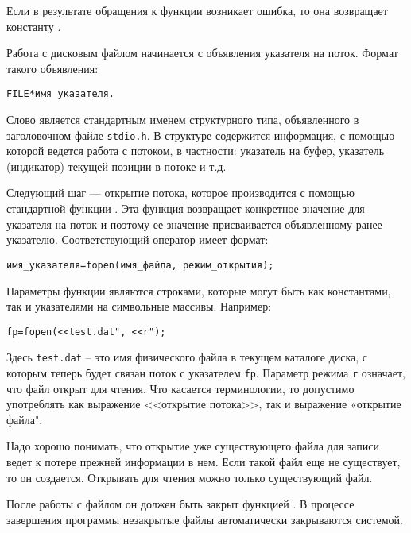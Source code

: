 Если в результате обращения к функции  возникает ошибка, то она возвращает константу .

Работа с дисковым файлом начинается с объявления указателя на поток. Формат такого объявления:
\begin{verbatim}
FILE*имя указателя.
\end{verbatim}

Слово  является стандартным именем структурного типа, объявленного в заголовочном файле \verb|stdio.h|.
В структуре  содержится информация, с помощью которой ведется работа с потоком, в частности: указатель
на буфер, указатель (индикатор) текущей позиции в потоке и т.д.

Следующий шаг --- открытие потока, которое производится с помощью стандартной функции . Эта функция
возвращает конкретное значение для указателя на поток и поэтому ее значение присваивается объявленному ранее указателю.
Соответствующий оператор имеет формат:
\begin{verbatim}
имя_указателя=fopen(имя_файла, режим_открытия);
\end{verbatim}

Параметры функции  являются строками, которые могут быть как константами, так и указателями на символьные массивы. Например:

\begin{verbatim}
fp=fopen(<<test.dat", <<r");
\end{verbatim}

Здесь \verb|test.dat| – это имя физического файла в текущем каталоге диска, с которым теперь будет связан поток с указателем \verb|fp|.
Параметр режима \verb|r| означает, что файл открыт для чтения. Что касается терминологии, то допустимо употреблять как выражение
<<открытие потока>>, так и выражение «открытие файла".

Надо хорошо понимать, что открытие уже существующего файла для записи ведет к потере прежней информации в нем. Если такой файл еще
не существует, то он создается. Открывать для чтения можно только существующий файл.

После работы с файлом он должен быть закрыт функцией . В процессе завершения программы незакрытые файлы автоматически закрываются системой.

